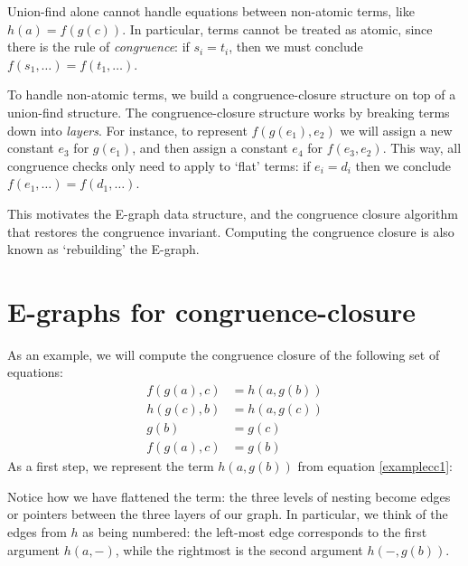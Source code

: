 \documentclass[12pt,a4paper,twoside,openright]{report}
\numberwithin{equation}{chapter}		%
\numberwithin{figure}{chapter}			%
\numberwithin{table}{chapter}			%
\theoremstyle{definition}
\theoremstyle{plain}
\def \globalscale {1.000000}
\begin{document}
Union-find alone cannot handle equations between non-atomic terms, like $h(a) = f(g(c))$. In particular, terms cannot be treated as atomic, since there is the rule of \emph{congruence}: if $s_i = t_i$, then we must conclude $f(s_1, \ldots) = f(t_1, \ldots)$. 

To handle non-atomic terms, we build a congruence-closure structure on top of a union-find structure. The congruence-closure structure works by breaking terms down into \emph{layers}. For instance, to represent $f(g(e_1), e_2)$ we will assign a new constant $e_3$ for $g(e_1)$, and then assign a constant $e_4$ for $f(e_3, e_2)$. This way, all congruence checks only need to apply to `flat' terms: if $e_i = d_i$ then we conclude $f(e_1, \ldots) = f(d_1, \ldots)$.

This motivates the E-graph data structure, and the congruence closure algorithm that restores the congruence invariant. Computing the congruence closure is also known as `rebuilding' the E-graph.

\section{E-graphs for congruence-closure} \label{egraphs}
\raggedbottom

As an example, we will compute the congruence closure of the following set of equations:
\begin{align}
  \label{examplecc1}	f(g(a), c) &= h(a, g(b)) \\
  \label{examplecc2}	h(g(c), b) &= h(a, g(c)) \\
  \label{examplecc3}	g(b) &= g(c) \\
  \label{examplecc4}	f(g(a), c) &= g(b)
\end{align}
As a first step, we represent the term $h(a, g(b))$ from equation \ref{examplecc1}:
\begin{center}
	\begin{tikzpicture}[y=1cm, x=1cm, yscale=\globalscale,xscale=\globalscale, every node/.append style={scale=\globalscale}, inner sep=0pt, outer sep=0pt]
		
	\end{tikzpicture}
    \label{exampleBasic1}
\end{center}
Notice how we have flattened the term: the three levels of nesting become edges or pointers between the three layers of our graph. In particular, we think of the edges from $h$ as being numbered: the left-most edge corresponds to the first argument $h(a, -)$, while the rightmost is the second argument $h(-, g(b))$. 
\end{document}
